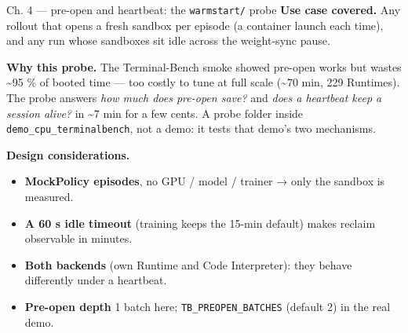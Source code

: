 \documentclass[
  10pt,
  ignorenonframetext,
  aspectratio=169,
  t]{beamer}
\providecommand{\tightlist}{%
  \setlength{\itemsep}{0pt}\setlength{\parskip}{0pt}}
\begin{document}
\begin{frame}{Ch. 4 --- pre-open and heartbeat: the
\texttt{warmstart/} probe}
\protect\hypertarget{ch.-4-pre-open-and-heartbeat-the-warmstart-probe}{}
\textbf{Use case covered.} Any rollout that opens a fresh sandbox per
episode (a container launch each time), and any run whose sandboxes sit
idle across the weight-sync pause.

\textbf{Why this probe.} The Terminal-Bench smoke showed pre-open works
but wastes \textasciitilde95 \% of booted time --- too costly to tune at
full scale (\textasciitilde70 min, 229 Runtimes). The probe answers
\emph{how much does pre-open save?} and \emph{does a heartbeat keep a
session alive?} in \textasciitilde7 min for a few cents. A probe folder
inside \texttt{demo\_cpu\_terminalbench}, not a demo: it tests that
demo's two mechanisms.

\textbf{Design considerations.}

\begin{itemize}
\tightlist
\item
  \textbf{MockPolicy episodes}, no GPU / model / trainer → only the
  sandbox is measured.
\item
  \textbf{A 60 s idle timeout} (training keeps the 15-min default) makes
  reclaim observable in minutes.
\item
  \textbf{Both backends} (own Runtime and Code Interpreter): they behave
  differently under a heartbeat.
\item
  \textbf{Pre-open depth} 1 batch here; \texttt{TB\_PREOPEN\_BATCHES}
  (default 2) in the real demo.
\end{itemize}
\end{frame}
\end{document}

